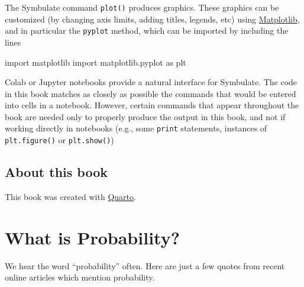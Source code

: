 \documentclass[
  letterpaper,
  DIV=11,
  numbers=noendperiod]{scrreprt}
\newenvironment{Shaded}{\begin{snugshade}}{\end{snugshade}}
\newcommand{\ImportTok}[1]{\textcolor[rgb]{0.00,0.46,0.62}{#1}}
\newcommand{\NormalTok}[1]{\textcolor[rgb]{0.00,0.23,0.31}{#1}}
\theoremstyle{plain}
\theoremstyle{definition}
\theoremstyle{definition}
\theoremstyle{definition}
\theoremstyle{remark}
\begin{document}
The Symbulate command \texttt{plot()} produces graphics. These graphics
can be customized (by changing axis limits, adding titles, legends, etc)
using \href{https://matplotlib.org/}{Matplotlib}, and in particular the
\texttt{pyplot} method, which can be imported by including the lines

\begin{Shaded}
\begin{Highlighting}[]
\ImportTok{import}\NormalTok{ matplotlib}
\ImportTok{import}\NormalTok{ matplotlib.pyplot }\ImportTok{as}\NormalTok{ plt}
\end{Highlighting}
\end{Shaded}

Colab or Jupyter notebooks provide a natural interface for Symbulate.
The code in this book matches as closely as possible the commands that
would be entered into cells in a notebook. However, certain commands
that appear throughout the book are needed only to properly produce the
output in this book, and not if working directly in notebooks (e.g.,
some \texttt{print} statements, instances of \texttt{plt.figure()} or
\texttt{plt.show()})

\section*{About this book}\label{about-this-book}


This book was created with \href{https://quarto.org/}{Quarto}.


\chapter{What is Probability?}\label{sec-prob-literacy}

We hear the word ``probability'' often. Here are just a few quotes from
recent online articles which mention probability.
\end{document}
